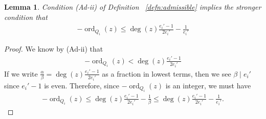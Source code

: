 \documentclass{amsart}
\theoremstyle{plain}
\newtheorem{lem}[thm]{Lemma}
\theoremstyle{definition}
\theoremstyle{remark}
\numberwithin{equation}{section}
\DeclareMathOperator{\ord}{ord}
\newcommand \subhalf[1]{\frac{{#1} - 1}{2{#1}}}
\begin{document}
\begin{lem}
\label{lem:admissible_inequality}
Condition (Ad-ii) of Definition ~\ref{defn:admissible} implies the stronger condition that
\begin{align*}
	-\ord_{Q_i}(z) \leq \deg(z) \subhalf{e_i'}-\frac{1}{e_i'}
\end{align*}
\end{lem}
\begin{proof}
We know by (Ad-ii) that
\begin{align*}
	-\ord_{Q_i}(z) < \deg(z) \subhalf{e_i'}
\end{align*}
If we write $\frac{\alpha}{\beta} = \deg(z) \frac{e_i'-1}{2e_i'}$ as a fraction in lowest terms, then we see $\beta \mid e_i'$ since $e_i'-1$ is even. Therefore, since $-\ord_{Q_i}(z)$ is an integer, we must have
\begin{align*}
	-\ord_{Q_i}(z) \leq \deg(z) \subhalf{e_i'}- \frac{1}{\beta} \leq \deg(z) \subhalf{e_i'}- \frac{1}{e_i'}.
\end{align*}
\end{proof}
\end{document}
